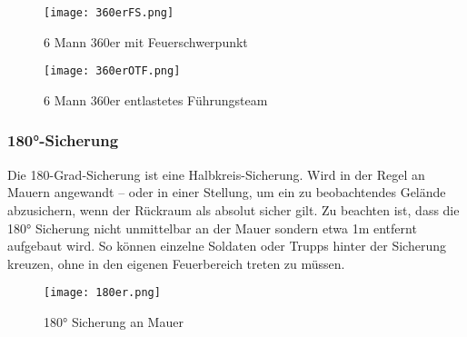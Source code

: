 		\begin{figure}[htbp]
			\centering
			\texttt{[image: 360erFS.png]}	
			\caption{6 Mann 360er mit Feuerschwerpunkt}
		\end{figure}

		\begin{figure}[htbp]
			\centering
			\texttt{[image: 360erOTF.png]}
			\caption{6 Mann 360er entlastetes Führungsteam}
		\end{figure}

\subsubsection{180°-Sicherung}
	Die 180-Grad-Sicherung ist eine Halbkreis-Sicherung. Wird in der Regel an Mauern angewandt – oder in einer Stellung, um ein zu beobachtendes Gelände abzusichern, wenn der Rückraum als absolut sicher gilt. Zu beachten ist, dass die 180° Sicherung nicht unmittelbar an der Mauer sondern etwa 1m entfernt aufgebaut wird. So können einzelne Soldaten oder Trupps hinter der Sicherung kreuzen, ohne in den eigenen Feuerbereich treten zu müssen. \\
	\begin{figure}[htbp]
		\centering
		\texttt{[image: 180er.png]}
		\caption{180° Sicherung an Mauer}
		\end{figure}
\newpage